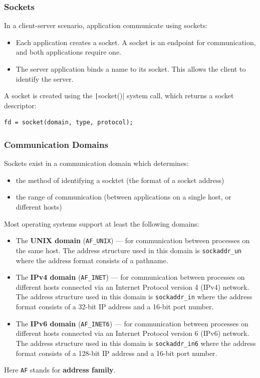 \documentclass{article}
\begin{document}
\subsubsection{Sockets}
In a client-server scenario, application communicate using sockets:
\begin{itemize}
    \item Each application creates a socket. A socket is an endpoint
          for communication, and both applications require one.
    \item The server application binds a name to its socket. This
          allows the client to identify the server.
\end{itemize}
A socket is created using the \texttt|socket()| system call,
which returns a socket descriptor:
\begin{verbatim}
fd = socket(domain, type, protocol);
\end{verbatim}
\subsubsection{Communication Domains}
Sockets exist in a communication domain which determines:
\begin{itemize}
    \item the method of identifying a socktet (the format of a socket
          address)
    \item the range of communication (between applications on a single
          host, or different hosts)
\end{itemize}
Most operating systems support at least the following domains:
\begin{itemize}
    \item The \textbf{UNIX domain} (\texttt{AF_UNIX}) --- for
          communication between processes on the same host. The address
          structure used in this domain is \texttt{sockaddr_un}
          where the address format consists of a pathname.
    \item The \textbf{IPv4 domain} (\texttt{AF_INET}) --- for
          communication between processes on different hosts connected
          via an Internet Protocol version 4 (IPv4) network. The
          address structure used in this domain is
          \texttt{sockaddr_in} where the address format consists
          of a 32-bit IP address and a 16-bit port number.
    \item The \textbf{IPv6 domain} (\texttt{AF_INET6}) --- for
          communication between processes on different hosts connected
          via an Internet Protocol version 6 (IPv6) network. The
          address structure used in this domain is
          \texttt{sockaddr_in6} where the address format
          consists of a 128-bit IP address and a 16-bit port number.
\end{itemize}
Here \texttt{AF} stands for \textbf{address family}.
\end{document}
